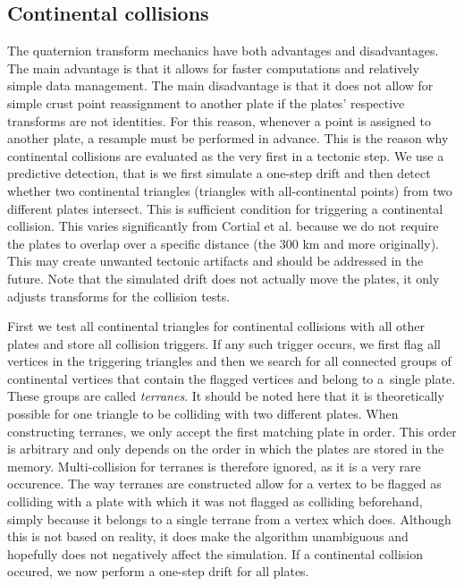 \subsection{Continental collisions}
The quaternion transform mechanics have both advantages and disadvantages. The main advantage is that it allows for faster computations and relatively simple data management. The main disadvantage is that it does not allow for simple crust point reassignment to another plate if the plates' respective transforms are not identities. For this reason, whenever a point is assigned to another plate, a resample must be performed in advance. This is the reason why continental collisions are evaluated as the very first in a tectonic step. We use a predictive detection, that is we first simulate a one-step drift and then detect whether two continental triangles (triangles with all-continental points) from two different plates intersect. This is sufficient condition for triggering a continental collision. This varies significantly from Cortial et al. because we do not require the plates to overlap over a specific distance (the 300 km and more originally). This may create unwanted tectonic artifacts and should be addressed in the future. Note that the simulated drift does not actually move the plates, it only adjusts transforms for the collision tests.

First we test all continental triangles for continental collisions with all other plates and store all collision triggers. If any such trigger occurs, we first flag all vertices in the triggering triangles and then we search for all connected groups of continental vertices that contain the flagged vertices and belong to a~single plate. These groups are called \textit{terranes}. It should be noted here that it is theoretically possible for one triangle to be colliding with two different plates. When constructing terranes, we only accept the first matching plate in order. This order is arbitrary and only depends on the order in which the plates are stored in the memory. Multi-collision for terranes is therefore ignored, as it is a very rare occurence. The way terranes are constructed allow for a vertex to be flagged as colliding with a plate with which it was not flagged as colliding beforehand, simply because it belongs to a single terrane from a vertex which does. Although this is not based on reality, it does make the algorithm unambiguous and hopefully does not negatively affect the simulation. If a continental collision occured, we now perform a one-step drift for all plates.


